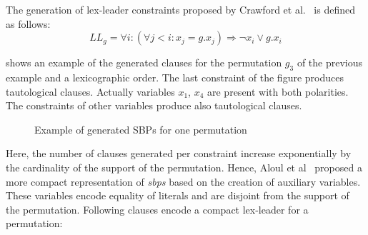 %
%
%

The generation of lex-leader constraints proposed by Crawford et al.~\cite{crawford1996symmetry} is defined as follows:
$$ LL_g = \forall i : (\forall j < i : x_j = g.x_j) \Rightarrow  \neg x_i \lor g.x_i$$
 
  shows an example of the generated clauses for the  permutation $g_3$ of the previous 
 example and a lexicographic order. The last constraint of the figure produces tautological clauses.
 Actually variables $x_1$, $x_4$ are present with both polarities. The constraints of other variables produce 
 also tautological clauses. 
 
 \begin{figure}[!htbp]
  
  \caption{Example of generated SBPs for one permutation}
  \label{fig:esbp_gen}
 \end{figure}

Here, the number of clauses generated per constraint increase exponentially by the 
cardinality of the support  of the permutation. Hence, Aloul et al~\cite{aloul06} proposed a more compact representation of \textit{sbps} based on the creation of auxiliary variables.  
These variables encode equality of literals and are disjoint from the support of the permutation.
Following clauses encode a compact lex-leader for a permutation:


